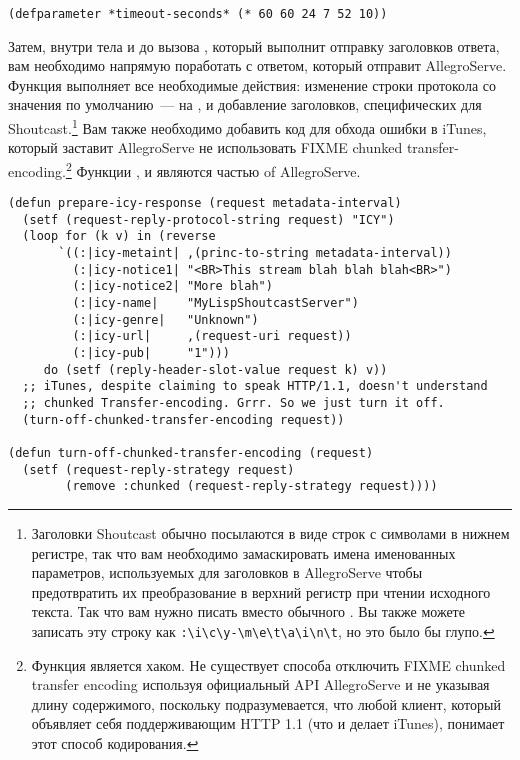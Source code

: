 \begin{lstlisting}
(defparameter *timeout-seconds* (* 60 60 24 7 52 10))
\end{lstlisting}

Затем, внутри тела  и до вызова , который
выполнит отправку заголовков ответа, вам необходимо напрямую поработать с ответом, который
отправит AllegroServe.  Функция  выполняет все необходимые
действия: изменение строки протокола со значения по умолчанию~---  на
, и добавление заголовков, специфических для Shoutcast.\footnote{Заголовки
  Shoutcast обычно посылаются в виде строк с символами в нижнем регистре, так что вам
  необходимо замаскировать имена именованных параметров, используемых для заголовков в
  AllegroServe чтобы предотвратить их преобразование в верхний регистр при чтении
  исходного текста.  Так что вам нужно писать  вместо обычного
  .  Вы также можете записать эту строку как
  \lstinline!:\i\c\y-\m\e\t\a\i\n\t!, но это было бы глупо.}  Вам также необходимо
добавить код для обхода ошибки в iTunes, который заставит AllegroServe не использовать
FIXME chunked transfer-encoding.\footnote{Функция
   является хаком.  Не существует способа
  отключить FIXME chunked transfer encoding используя официальный API AllegroServe и не
  указывая длину содержимого, поскольку подразумевается, что любой клиент, который
  объявляет себя поддерживающим HTTP 1.1 (что и делает iTunes), понимает этот способ
  кодирования.}  Функции ,  и
 являются частью of AllegroServe.

\begin{lstlisting}
(defun prepare-icy-response (request metadata-interval)
  (setf (request-reply-protocol-string request) "ICY")
  (loop for (k v) in (reverse
       `((:|icy-metaint| ,(princ-to-string metadata-interval))
         (:|icy-notice1| "<BR>This stream blah blah blah<BR>")
         (:|icy-notice2| "More blah")
         (:|icy-name|    "MyLispShoutcastServer")
         (:|icy-genre|   "Unknown")
         (:|icy-url|     ,(request-uri request))
         (:|icy-pub|     "1")))
     do (setf (reply-header-slot-value request k) v))
  ;; iTunes, despite claiming to speak HTTP/1.1, doesn't understand
  ;; chunked Transfer-encoding. Grrr. So we just turn it off.
  (turn-off-chunked-transfer-encoding request))

(defun turn-off-chunked-transfer-encoding (request)
  (setf (request-reply-strategy request)
        (remove :chunked (request-reply-strategy request))))
\end{lstlisting}

